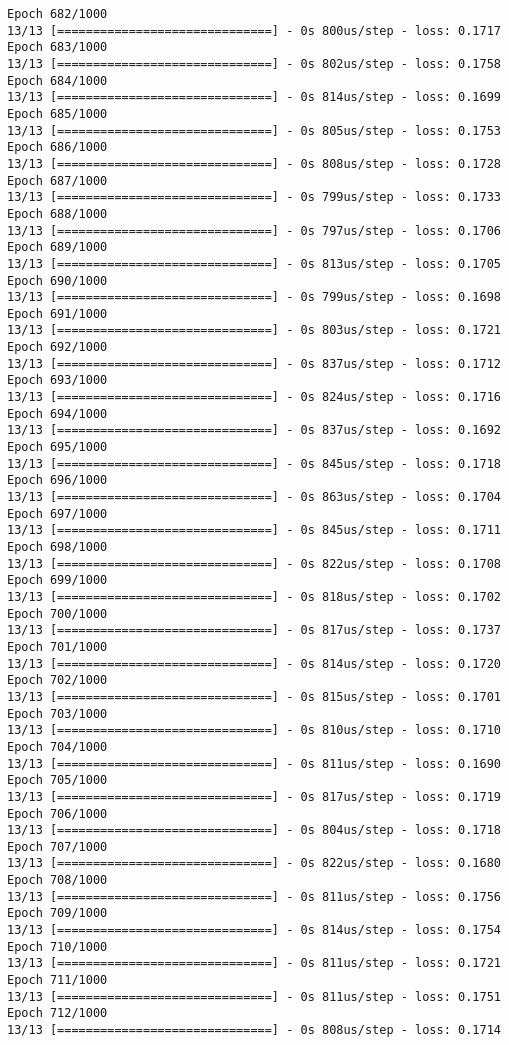 \documentclass[11pt]{article}
\begin{document}
\begin{Verbatim}[commandchars=\\\{\}]
Epoch 682/1000
13/13 [==============================] - 0s 800us/step - loss: 0.1717
Epoch 683/1000
13/13 [==============================] - 0s 802us/step - loss: 0.1758
Epoch 684/1000
13/13 [==============================] - 0s 814us/step - loss: 0.1699
Epoch 685/1000
13/13 [==============================] - 0s 805us/step - loss: 0.1753
Epoch 686/1000
13/13 [==============================] - 0s 808us/step - loss: 0.1728
Epoch 687/1000
13/13 [==============================] - 0s 799us/step - loss: 0.1733
Epoch 688/1000
13/13 [==============================] - 0s 797us/step - loss: 0.1706
Epoch 689/1000
13/13 [==============================] - 0s 813us/step - loss: 0.1705
Epoch 690/1000
13/13 [==============================] - 0s 799us/step - loss: 0.1698
Epoch 691/1000
13/13 [==============================] - 0s 803us/step - loss: 0.1721
Epoch 692/1000
13/13 [==============================] - 0s 837us/step - loss: 0.1712
Epoch 693/1000
13/13 [==============================] - 0s 824us/step - loss: 0.1716
Epoch 694/1000
13/13 [==============================] - 0s 837us/step - loss: 0.1692
Epoch 695/1000
13/13 [==============================] - 0s 845us/step - loss: 0.1718
Epoch 696/1000
13/13 [==============================] - 0s 863us/step - loss: 0.1704
Epoch 697/1000
13/13 [==============================] - 0s 845us/step - loss: 0.1711
Epoch 698/1000
13/13 [==============================] - 0s 822us/step - loss: 0.1708
Epoch 699/1000
13/13 [==============================] - 0s 818us/step - loss: 0.1702
Epoch 700/1000
13/13 [==============================] - 0s 817us/step - loss: 0.1737
Epoch 701/1000
13/13 [==============================] - 0s 814us/step - loss: 0.1720
Epoch 702/1000
13/13 [==============================] - 0s 815us/step - loss: 0.1701
Epoch 703/1000
13/13 [==============================] - 0s 810us/step - loss: 0.1710
Epoch 704/1000
13/13 [==============================] - 0s 811us/step - loss: 0.1690
Epoch 705/1000
13/13 [==============================] - 0s 817us/step - loss: 0.1719
Epoch 706/1000
13/13 [==============================] - 0s 804us/step - loss: 0.1718
Epoch 707/1000
13/13 [==============================] - 0s 822us/step - loss: 0.1680
Epoch 708/1000
13/13 [==============================] - 0s 811us/step - loss: 0.1756
Epoch 709/1000
13/13 [==============================] - 0s 814us/step - loss: 0.1754
Epoch 710/1000
13/13 [==============================] - 0s 811us/step - loss: 0.1721
Epoch 711/1000
13/13 [==============================] - 0s 811us/step - loss: 0.1751
Epoch 712/1000
13/13 [==============================] - 0s 808us/step - loss: 0.1714

\end{Verbatim}
\end{document}
